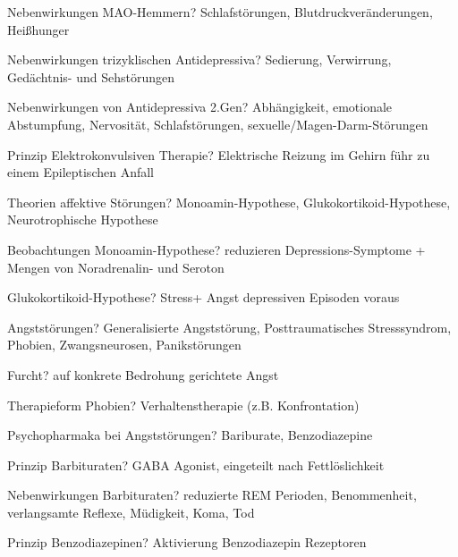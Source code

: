 \documentclass[a4paper]{article}
\begin{document}
\begin{multicols}{3}
  Nebenwirkungen MAO-Hemmern? Schlafstörungen, Blutdruckveränderungen, Heißhunger

  Nebenwirkungen trizyklischen Antidepressiva? Sedierung, Verwirrung, Gedächtnis- und Sehstörungen

  Nebenwirkungen von Antidepressiva 2.Gen? Abhängigkeit, emotionale Abstumpfung, Nervosität, Schlafstörungen, sexuelle/Magen-Darm-Störungen

  Prinzip Elektrokonvulsiven Therapie? Elektrische Reizung im Gehirn führ zu einem Epileptischen Anfall

  Theorien affektive Störungen? Monoamin-Hypothese, Glukokortikoid-Hypothese, Neurotrophische Hypothese

  Beobachtungen Monoamin-Hypothese? reduzieren Depressions-Symptome + Mengen von Noradrenalin- und Seroton

  Glukokortikoid-Hypothese? Stress+ Angst depressiven Episoden voraus

  Angststörungen? Generalisierte Angststörung, Posttraumatisches Stresssyndrom, Phobien, Zwangsneurosen, Panikstörungen

  Furcht? auf konkrete Bedrohung gerichtete Angst

  Therapieform Phobien? Verhaltenstherapie (z.B. Konfrontation)

  Psychopharmaka bei Angststörungen? Bariburate, Benzodiazepine

  Prinzip Barbituraten? GABA Agonist, eingeteilt nach Fettlöslichkeit %

  Nebenwirkungen Barbituraten? reduzierte REM Perioden, Benommenheit, verlangsamte Reflexe, Müdigkeit, Koma, Tod

  Prinzip Benzodiazepinen? Aktivierung Benzodiazepin Rezeptoren %


\end{multicols}
\end{document}
